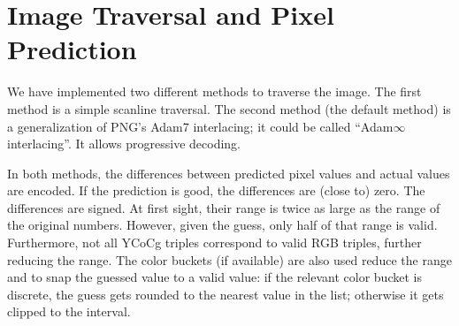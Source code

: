 \documentclass{article}
\begin{document}




\section{Image Traversal and Pixel Prediction}
\label{sec:traversal}

We have implemented two different methods to traverse the image.
The first method is a simple scanline traversal. %
The second method (the default method) is a generalization of PNG's Adam7 interlacing; it could be called ``Adam$\infty$ interlacing''.
It allows progressive decoding.

In both methods, the differences between predicted pixel values and actual values are encoded.
If the prediction is good, the differences are (close to) zero.
%
The differences
are signed.
At first sight, their range
is twice as large as the range of the original numbers. However, given the guess, only
half of that range is valid. Furthermore, not all YCoCg triples correspond
to valid RGB triples, further reducing the range.
The color buckets (if available)
are also used reduce the range and to snap the guessed value to a valid value:
if the relevant color bucket is discrete, the guess gets rounded to the nearest value in the list;
otherwise it
gets clipped to the interval.
\end{document}
